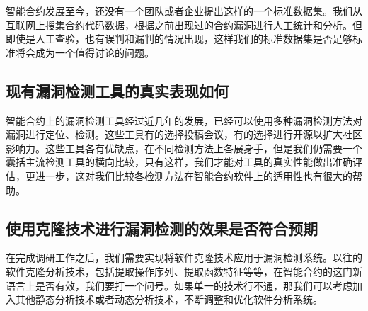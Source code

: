 智能合约发展至今，还没有一个团队或者企业提出这样的一个标准数据集。我们从互联网上搜集合约代码数据，根据之前出现过的合约漏洞进行人工统计和分析。但即使是人工查验，也有误判和漏判的情况出现，这样我们的标准数据集是否足够标准将会成为一个值得讨论的问题。

\subsection{现有漏洞检测工具的真实表现如何}

智能合约上的漏洞检测工具经过近几年的发展，已经可以使用多种漏洞检测方法对漏洞进行定位、检测。这些工具有的选择投稿会议，有的选择进行开源以扩大社区影响力。这些工具各有优缺点，在不同检测方法上各展身手，但是我们仍需要一个囊括主流检测工具的横向比较，只有这样，我们才能对工具的真实性能做出准确评估，更进一步，这对我们比较各检测方法在智能合约软件上的适用性也有很大的帮助。


\subsection{使用克隆技术进行漏洞检测的效果是否符合预期}

在完成调研工作之后，我们需要实现将软件克隆技术应用于漏洞检测系统。以往的软件克隆分析技术，包括提取操作序列、提取函数特征等等，在智能合约的这门新语言上是否有效，我们要打一个问号。如果单一的技术行不通，那我们可以考虑加入其他静态分析技术或者动态分析技术，不断调整和优化软件分析系统。
